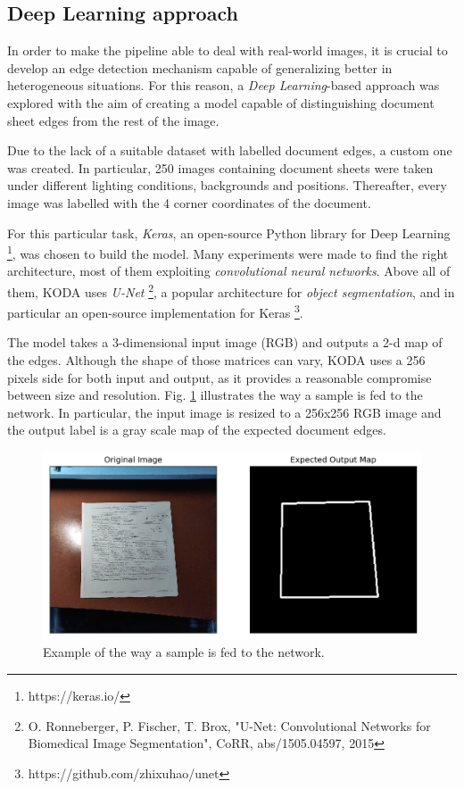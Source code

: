 \documentclass[a4paper]{article}
\begin{document}
\subsection{Deep Learning approach}

In order to make the pipeline able to deal with real-world images, it is crucial to develop an
edge detection mechanism capable of generalizing better in heterogeneous situations. 
For this reason, a \textit{Deep Learning}-based approach was explored with the aim of creating a model
capable of distinguishing document sheet edges from the rest of the image.

Due to the lack of a suitable dataset with labelled document edges, a custom one was created.
In particular, 250 images containing document sheets were taken under different lighting conditions, 
backgrounds and positions. Thereafter, every image was labelled with the 4 corner coordinates of the document.

For this particular task, \textit{Keras}, an open-source Python library for Deep Learning \footnote{https://keras.io/}, was chosen to build the model. Many experiments were made to find the right architecture, most of them 
exploiting \textit{convolutional neural networks}. Above all of them, KODA uses \textit{U-Net}
\footnote{O. Ronneberger, P. Fischer, T. Brox, "U-Net: Convolutional Networks for Biomedical Image Segmentation", CoRR, abs/1505.04597, 2015}, a popular architecture for \textit{object segmentation}, and in particular an open-source implementation for Keras \footnote{https://github.com/zhixuhao/unet}.

The model takes a 3-dimensional input image (RGB) and outputs a 2-d map of the edges. Although the shape
of those matrices can vary, KODA uses a 256 pixels side for both input and output, as it provides a reasonable compromise between size and resolution. Fig. \ref{fig:label_edge} illustrates the way a
sample is fed to the network. In particular, the input image is resized to a 256x256 RGB image and the
output label is a gray scale map of the expected document edges.

\begin{figure}[htb!]
	\includegraphics[width=\linewidth]{label_edge.png}
	\caption{Example of the way a sample is fed to the network.}
	\label{fig:label_edge}
\end{figure}
\end{document}
